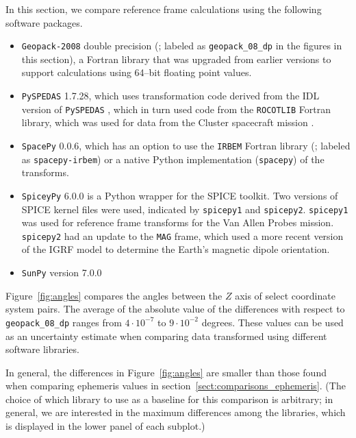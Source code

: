 \documentclass[draft]{agujournal2019}
\begin{document}
In this section, we compare reference frame calculations using the following software packages. 

\begin{itemize}
    \item \texttt{Geopack-2008} double precision (; labeled as \texttt{geopack\_08\_dp} in the figures in this section), a Fortran library that was upgraded from earlier versions to support calculations using 64--bit floating point values.
    \item \texttt{PySPEDAS} 1.7.28, which uses transformation code derived from the IDL version of \texttt{PySPEDAS} \cite{Angelopoulos2024IDL}, which in turn used code from the \texttt{ROCOTLIB} Fortran \cite{ROCOTLIB} library, which was used for data from the Cluster spacecraft mission \cite{ClusterTools1993}.
    \item \texttt{SpacePy} 0.0.6, which has an option to use the \texttt{IRBEM} Fortran library (; labeled as \texttt{spacepy-irbem}) or a native Python implementation (\texttt{spacepy}) of the transforms.
    \item \texttt{SpiceyPy} 6.0.0 is a Python wrapper for the SPICE toolkit. Two versions of SPICE kernel files were used, indicated by \texttt{spicepy1} and \texttt{spicepy2}. \texttt{spicepy1} was used for reference frame transforms for the Van Allen Probes mission. \texttt{spicepy2} had an update to the \texttt{MAG} frame, which used a more recent version of the IGRF model \cite{Alken2021} to determine the Earth's magnetic dipole orientation.
    \item \texttt{SunPy} version 7.0.0
\end{itemize}

Figure~\ref{fig:angles} compares the angles between the $Z$ axis of select coordinate system pairs. The average of the absolute value of the differences with respect to \texttt{geopack\_08\_dp} ranges from $4\cdot 10^{-7}$ to $9\cdot 10^{-2}$ degrees. These values can be used as an uncertainty estimate when comparing data transformed using different software libraries.

In general, the differences in Figure~\ref{fig:angles} are smaller than those found when comparing ephemeris values in section~\ref{sect:comparisons_ephemeris}. (The choice of which library to use as a baseline for this comparison is arbitrary; in general, we are interested in the maximum differences among the libraries, which is displayed in the lower panel of each subplot.)
\end{document}
